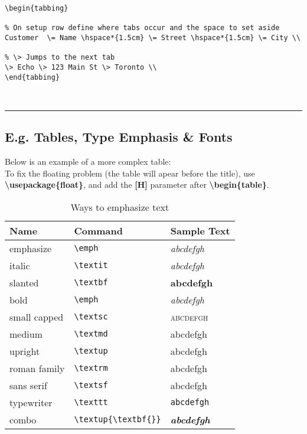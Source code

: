 \documentclass[a4paper,12pt,titlepage]{article}
\begin{document}
\begin{lstlisting}  
\begin{tabbing}

% On setup row define where tabs occur and the space to set aside
Customer  \= Name \hspace*{1.5cm} \= Street \hspace*{1.5cm} \= City \\

% \> Jumps to the next tab
\> Echo \> 123 Main St \> Toronto \\
\end{tabbing}
\end{lstlisting}  
~\\
\rule{\linewidth}{0.1mm}



\subsection{E.g. Tables, Type Emphasis \& Fonts}
Below is an example of a more complex table:
\\To fix the floating problem (the table will apear before the title), use \textbf{\textbackslash usepackage\{float\}}, and add the \textbf{[H]} parameter after \textbf{\textbackslash begin\{table\}}.
\\
\begin{table}[H]
\center
	\begin{tabular}{l|l|l}
	\hline
	\textbf{Name} & \textbf{Command} & \textbf{Sample Text} \\
	\hline
	
	emphasize & \verb|\emph| & \emph{abcdefgh} \\
	italic & \verb|\textit| & \textit{abcdefgh} \\
	slanted & \verb|\textbf| & \textbf{abcdefgh} \\
	bold & \verb|\emph| & \emph{abcdefgh} \\
	small capped & \verb|\textsc| & \textsc{abcdefgh} \\
	medium & \verb|\textmd| & \textmd{abcdefgh} \\
	upright & \verb|\textup| & \textup{abcdefgh} \\
	roman family & \verb|\textrm| & \textrm{abcdefgh} \\
	sans serif & \verb|\textsf| & \textsf{abcdefgh} \\
	typewriter & \verb|\texttt| & \texttt{abcdefgh} \\
	combo & \verb|\textup{\textbf{}}| & \textit{\textbf{abcdefgh}} \\
	\end{tabular}
	\caption{Ways to emphasize text}
\end{table}
~\\
\end{document}
